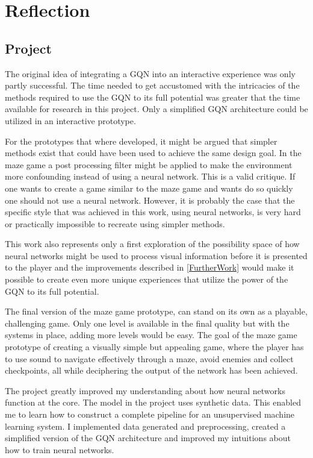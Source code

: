 
\chapter{Reflection}
\section{Project}
The original idea of integrating a GQN into an interactive experience was only partly successful. The time needed to get accustomed with the intricacies of the methods required to use the GQN to its full potential was greater that the time available for research in this project. Only a simplified GQN architecture could be utilized in an interactive prototype.

For the prototypes that where developed, it might be argued that simpler methods exist that could have been used to achieve the same design goal. In the maze game a post processing filter might be applied to make the environment more confounding instead of using a neural network. This is a valid critique. If one wants to create a game similar to the maze game and wants do so quickly one should not use a neural network. However, it is probably the case that the specific style that was achieved in this work, using neural networks, is very hard or practically impossible to recreate using simpler methods.

This work also represents only a first exploration of the possibility space of how neural networks might be used to process visual information before it is presented to the player and the improvements described in \cref{FurtherWork} would make it possible to create even more unique experiences that utilize the power of the GQN to its full potential.

The final version of the maze game prototype, can stand on its own as a playable, challenging game. Only one level is available in the final quality but with the systems in place, adding more levels would be easy. The goal of the maze game prototype of creating a visually simple but appealing game, where the player has to use sound to navigate effectively through a maze, avoid enemies and collect checkpoints, all while deciphering the output of the network has been achieved.

The project greatly improved my understanding about how neural networks function at the core. The model in the project uses synthetic data. This enabled me to learn how to construct a complete pipeline for an unsupervised machine learning system. I implemented data generated and preprocessing, created a simplified version of the GQN architecture and improved my intuitions about how to train neural networks.


